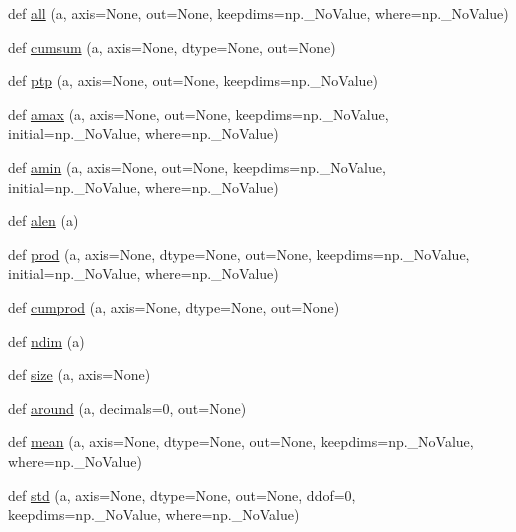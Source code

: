 \begin{DoxyCompactItemize}
\item 
def \hyperlink{namespacenumpy_1_1core_1_1fromnumeric_aec1c1c22945bfd82b42a4a4aaba06d0b}{all} (a, axis=None, out=None, keepdims=np.\+\_\+\+No\+Value, where=np.\+\_\+\+No\+Value)
\item 
def \hyperlink{namespacenumpy_1_1core_1_1fromnumeric_a31c9fb5c7a09516669e2fcc4a3a60d0f}{cumsum} (a, axis=None, dtype=None, out=None)
\item 
def \hyperlink{namespacenumpy_1_1core_1_1fromnumeric_a5c706398eea13a7b56e01abcfcba39ec}{ptp} (a, axis=None, out=None, keepdims=np.\+\_\+\+No\+Value)
\item 
def \hyperlink{namespacenumpy_1_1core_1_1fromnumeric_a89dd12e112024ef78428195b5ba5bf7d}{amax} (a, axis=None, out=None, keepdims=np.\+\_\+\+No\+Value, initial=np.\+\_\+\+No\+Value, where=np.\+\_\+\+No\+Value)
\item 
def \hyperlink{namespacenumpy_1_1core_1_1fromnumeric_accc14da5c1e60491a6d9c5feb2893aca}{amin} (a, axis=None, out=None, keepdims=np.\+\_\+\+No\+Value, initial=np.\+\_\+\+No\+Value, where=np.\+\_\+\+No\+Value)
\item 
def \hyperlink{namespacenumpy_1_1core_1_1fromnumeric_aa295eac234c7db87c9644317b7c529af}{alen} (a)
\item 
def \hyperlink{namespacenumpy_1_1core_1_1fromnumeric_a581dd0c99549f980c18b4584eb416fb5}{prod} (a, axis=None, dtype=None, out=None, keepdims=np.\+\_\+\+No\+Value, initial=np.\+\_\+\+No\+Value, where=np.\+\_\+\+No\+Value)
\item 
def \hyperlink{namespacenumpy_1_1core_1_1fromnumeric_af121d8f5a4195e1a932089450235c8a2}{cumprod} (a, axis=None, dtype=None, out=None)
\item 
def \hyperlink{namespacenumpy_1_1core_1_1fromnumeric_a4eb4459882f37149eab23c97014fe487}{ndim} (a)
\item 
def \hyperlink{namespacenumpy_1_1core_1_1fromnumeric_a0fd718db4ebf1b1dd020bea493477918}{size} (a, axis=None)
\item 
def \hyperlink{namespacenumpy_1_1core_1_1fromnumeric_aa21d3030f7aed764965d201323f85a77}{around} (a, decimals=0, out=None)
\item 
def \hyperlink{namespacenumpy_1_1core_1_1fromnumeric_a520c4e347a902bc39c2d7bddb016405e}{mean} (a, axis=None, dtype=None, out=None, keepdims=np.\+\_\+\+No\+Value, where=np.\+\_\+\+No\+Value)
\item 
def \hyperlink{namespacenumpy_1_1core_1_1fromnumeric_adffa060dbb751a83ab96352b457ea951}{std} (a, axis=None, dtype=None, out=None, ddof=0, keepdims=np.\+\_\+\+No\+Value, where=np.\+\_\+\+No\+Value)

\end{DoxyCompactItemize}
